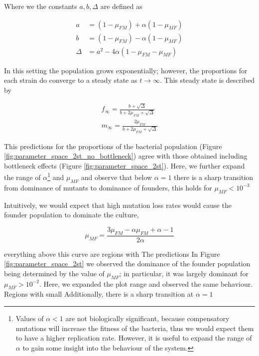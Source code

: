 \documentclass[10pt,a4paper]{scrartcl}
\begin{document}
Where we the constants $a, b, \Delta$ are defined as

\begin{align*}
a &= \left(1-\mu_{FM} \right ) + \alpha\left(1-\mu_{MF} \right ) \\
b &= \left(1-\mu_{FM} \right ) - \alpha\left(1-\mu_{MF} \right ) \\
\Delta &= a^2 - 4\alpha\left(1 - \mu_{FM} - \mu_{MF}\right)
\end{align*}

In this setting the population grows exponentially; however, the proportions for each strain do converge to a steady state as $t\rightarrow \infty$. This steady state is described by 

\begin{subequations}\label{eq:steady_state_no_bottleneck}
\begin{align}
f_\infty = \frac{b + \sqrt{\Delta}}{b + 2\mu_{FM} + \sqrt{\Delta}}\\
m_\infty = \frac{2\mu_{FM}}{b + 2\mu_{FM} + \sqrt{\Delta}}
\end{align}
\end{subequations}

This predictions for the proportions of the bacterial population (Figure \ref{fig:parameter_space_2st_no_bottleneck}) agree with those obtained including bottleneck effects (Figure \ref{fig:parameter_space_2st}). Here, we further expand the range of $\alpha$\footnote{Values of $\alpha < 1$ are not biologically significant, because compensatory mutations will increase the fitness of the bacteria, thus we would expect them to have a higher replication rate. However, it is useful to expand the range of $\alpha$ to gain some insight into the behaviour of the system.} 
and $\mu_{MF}$ and observe that below $\alpha = 1$ there is a sharp transition from dominance of mutants to dominance of founders, this holds for $\mu_{MF} < 10^{-3}$ 

Intuitively, we would expect that high mutation loss rates would cause the founder population to dominate the culture,

\begin{equation*}
\mu_{MF} = \frac{3\mu_{FM} - \alpha\mu_{FM} + \alpha - 1}{2\alpha}
\end{equation*}

everything above this curve are regions with 
The predictions
In Figure \ref{fig:parameter_space_2st} we observed the dominance of the founder population being determined by the value of $\mu_{MF}$; in particular, it was largely dominant for $\mu_{MF} > 10^{-2}$. Here, we expanded the plot range and observed the same behaviour. Regions with small 
Additionally, there is a sharp transition at $\alpha = 1$
\end{document}
